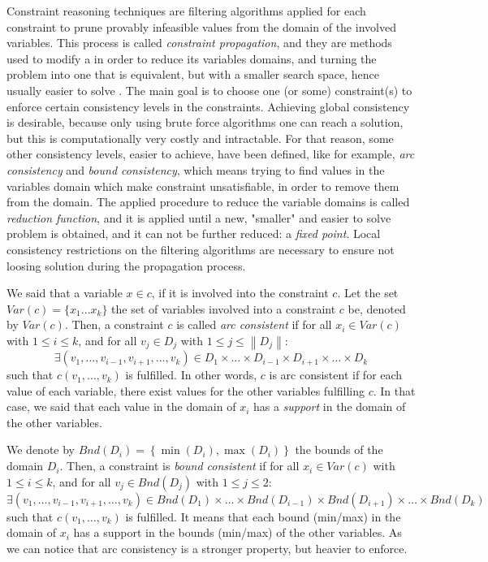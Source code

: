 Constraint reasoning techniques are filtering algorithms applied for each constraint to prune provably infeasible values from the domain of the involved variables. This process is called \textit{constraint propagation}, and they are methods used to modify a \CSP{} in order to reduce its variables domains, and turning the problem into one that is equivalent, but with a smaller search space, hence usually easier to solve \cite{ChristianBessiere2006}. The main goal is to choose one (or some) constraint(s) to enforce certain consistency levels in the constraints. Achieving global consistency is desirable, because only using brute force algorithms one can reach a solution, but this is computationally very costly and intractable. %
For that reason, some other consistency levels, easier to achieve, have been defined, like for example, \textit{arc consistency} and \textit{bound consistency}, which means trying to find values in the variables domain which make constraint unsatisfiable, in order to remove them from the domain. The applied procedure to reduce the variable domains is called \textit{reduction function}, and it is applied until a new, "smaller" and easier to solve problem is obtained, and it can not be further reduced: a \textit{fixed point}. Local consistency restrictions on the filtering algorithms are necessary to ensure not loosing solution during the propagation process.

We said that a variable $x \in c$, if it is involved into the constraint $c$. Let the set $Var(c) = \{x_1\dots x_k\}$ the set of variables  involved into a constraint $c$ be, denoted by $Var(c)$. Then, a constraint $c$ is called \textit{arc consistent} if for all $x_i \in Var(c)$ with $1\leq i\leq k$, and for all $v_j \in D_j$ with $1\leq j\leq \left\|D_j\right\|$:
\[
\exists (v_1, \dots, v_{i-1}, v_{i+1},\dots, v_k) \in D_1\times\dots\times D_{i-1}\times D_{i+1}\times\dots\times D_k
\]
such that $c(v_1, \dots, v_k)$ is fulfilled. In other words, $c$ is arc consistent if for each value of each variable, there exist values for the other variables fulfilling $c$. In that case, we said that each value in the domain of $x_i$ has a \textit{support} in the domain of the other variables.

We denote by $Bnd(D_i) = \left\{\min(D_i), \max(D_i)\right\}$ the bounds of the domain $D_i$. Then, a constraint is \textit{bound consistent} if for all $x_i \in Var(c)$ with $1\leq i\leq k$, and for all $v_j \in Bnd(D_j)$ with $1\leq j\leq 2$:
\[
\exists (v_1, \dots, v_{i-1}, v_{i+1},\dots, v_k) \in Bnd\left(D_1\right)\times\dots\times Bnd\left(D_{i-1}\right)\times Bnd\left(D_{i+1}\right)\times\dots\times Bnd\left(D_k\right)
\]
such that $c(v_1, \dots, v_k)$ is fulfilled. It means that each bound (min/max) in the domain of $x_i$ has a support in the bounds (min/max) of the other variables. As we can notice that arc consistency is a stronger property, but heavier to enforce.

